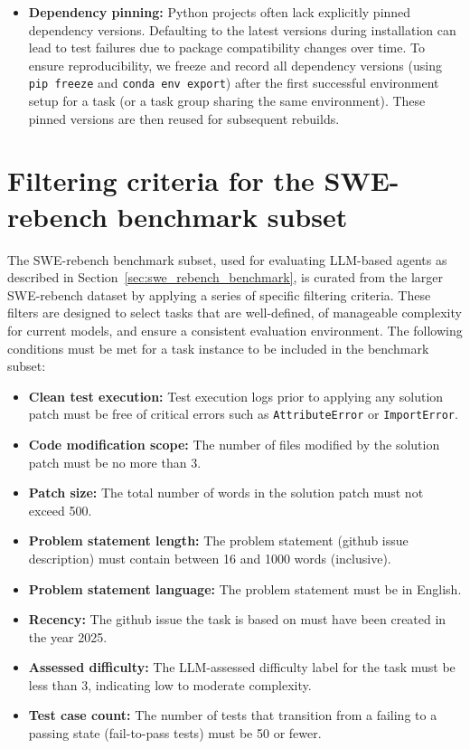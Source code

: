 \documentclass[dandb]{article}
\begin{document}
\begin{itemize}
    \item \textbf{Dependency pinning:} Python projects often lack explicitly pinned dependency versions. Defaulting to the latest versions during installation can lead to test failures due to package compatibility changes over time. To ensure reproducibility, we freeze and record all dependency versions (using \verb|pip freeze| and \verb|conda env export|) after the first successful environment setup for a task (or a task group sharing the same environment). These pinned versions are then reused for subsequent rebuilds.
\end{itemize}

\section{Filtering criteria for the SWE-rebench benchmark subset}
\label{appendix:filtering_criteria}

The SWE-rebench benchmark subset, used for evaluating LLM-based agents as described in Section~\ref{sec:swe_rebench_benchmark}, is curated from the larger SWE-rebench dataset by applying a series of specific filtering criteria. These filters are designed to select tasks that are well-defined, of manageable complexity for current models, and ensure a consistent evaluation environment. The following conditions must be met for a task instance to be included in the benchmark subset:

\begin{itemize}
    \item \textbf{Clean test execution:} Test execution logs prior to applying any solution patch must be free of critical errors such as \texttt{AttributeError} or \texttt{ImportError}.
    \item \textbf{Code modification scope:} The number of files modified by the solution patch must be no more than 3.
    \item \textbf{Patch size:} The total number of words in the solution patch must not exceed 500.
    \item \textbf{Problem statement length:} The problem statement (github issue description) must contain between 16 and 1000 words (inclusive).
    \item \textbf{Problem statement language:} The problem statement must be in English.
    \item \textbf{Recency:} The github issue the task is based on must have been created in the year 2025.
    \item \textbf{Assessed difficulty:} The LLM-assessed difficulty label for the task must be less than 3, indicating low to moderate complexity.
    \item \textbf{Test case count:} The number of tests that transition from a failing to a passing state (fail-to-pass tests) must be 50 or fewer.
\end{itemize}
\end{document}
